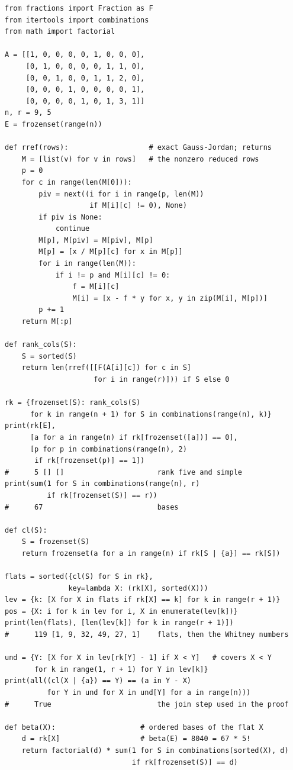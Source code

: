\documentclass[11pt]{amsart}
\theoremstyle{remark}
\begin{document}
{\small
\begin{verbatim}
from fractions import Fraction as F
from itertools import combinations
from math import factorial

A = [[1, 0, 0, 0, 0, 1, 0, 0, 0],
     [0, 1, 0, 0, 0, 0, 1, 1, 0],
     [0, 0, 1, 0, 0, 1, 1, 2, 0],
     [0, 0, 0, 1, 0, 0, 0, 0, 1],
     [0, 0, 0, 0, 1, 0, 1, 3, 1]]
n, r = 9, 5
E = frozenset(range(n))

def rref(rows):                   # exact Gauss-Jordan; returns
    M = [list(v) for v in rows]   # the nonzero reduced rows
    p = 0
    for c in range(len(M[0])):
        piv = next((i for i in range(p, len(M))
                    if M[i][c] != 0), None)
        if piv is None:
            continue
        M[p], M[piv] = M[piv], M[p]
        M[p] = [x / M[p][c] for x in M[p]]
        for i in range(len(M)):
            if i != p and M[i][c] != 0:
                f = M[i][c]
                M[i] = [x - f * y for x, y in zip(M[i], M[p])]
        p += 1
    return M[:p]

def rank_cols(S):
    S = sorted(S)
    return len(rref([[F(A[i][c]) for c in S]
                     for i in range(r)])) if S else 0

rk = {frozenset(S): rank_cols(S)
      for k in range(n + 1) for S in combinations(range(n), k)}
print(rk[E],
      [a for a in range(n) if rk[frozenset([a])] == 0],
      [p for p in combinations(range(n), 2)
       if rk[frozenset(p)] == 1])
#      5 [] []                      rank five and simple
print(sum(1 for S in combinations(range(n), r)
          if rk[frozenset(S)] == r))
#      67                           bases

def cl(S):
    S = frozenset(S)
    return frozenset(a for a in range(n) if rk[S | {a}] == rk[S])

flats = sorted({cl(S) for S in rk},
               key=lambda X: (rk[X], sorted(X)))
lev = {k: [X for X in flats if rk[X] == k] for k in range(r + 1)}
pos = {X: i for k in lev for i, X in enumerate(lev[k])}
print(len(flats), [len(lev[k]) for k in range(r + 1)])
#      119 [1, 9, 32, 49, 27, 1]    flats, then the Whitney numbers

und = {Y: [X for X in lev[rk[Y] - 1] if X < Y]   # covers X < Y
       for k in range(1, r + 1) for Y in lev[k]}
print(all((cl(X | {a}) == Y) == (a in Y - X)
          for Y in und for X in und[Y] for a in range(n)))
#      True                         the join step used in the proof

def beta(X):                    # ordered bases of the flat X
    d = rk[X]                   # beta(E) = 8040 = 67 * 5!
    return factorial(d) * sum(1 for S in combinations(sorted(X), d)
                              if rk[frozenset(S)] == d)


\end{verbatim}}
\end{document}
